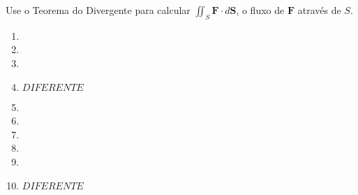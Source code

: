 



	
	
	\vspace{5mm}
	
	Use o Teorema do Divergente para calcular $\displaystyle \iint_S \textbf{F} \cdot d\textbf{S}$, o fluxo de $\textbf{F}$ através de $S$.
	
	\begin{enumerate}
		
		\item
		\resposta{}

		\item
		\resposta{}

		\item
		\resposta{}

		\item $DIFERENTE$

		\item
		\resposta{}

		\item
		\resposta{}

		\item
		\resposta{}

		\item
		\resposta{}

		\item
		\resposta{}

		\item $DIFERENTE$
	
	\end{enumerate}
		
	\vspace{5mm}	
	
	


